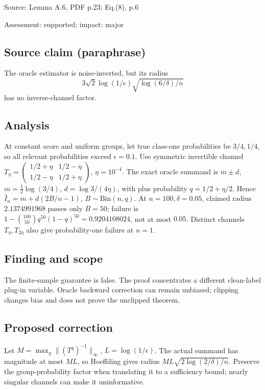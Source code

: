 \documentclass[11pt]{article}
\begin{document}
Source: Lemma A.6, PDF p.23; Eq.(8), p.6

Assessment: supported; impact: major

\subsection*{Source claim (paraphrase)}

The oracle estimator is noise-inverted, but its radius \[3\sqrt2\log(1/\epsilon)\sqrt{\log(6/\delta)/n}\] has no inverse-channel factor.

\subsection*{Analysis}

At constant score and uniform groups, let true class-one probabilities be \(3/4,1/4\), so all relevant probabilities exceed \(\epsilon=0.1\). Use symmetric invertible channel \(T_\eta=\begin{pmatrix}1/2+\eta&1/2-\eta\\1/2-\eta&1/2+\eta\end{pmatrix}\), \(\eta=10^{-4}\). The exact oracle summand is \(m\pm d\), \(m=\tfrac12\log(3/4)\), \(d=\log3/(4\eta)\), with plus probability \(q=1/2+\eta/2\). Hence \(\widehat I_n=m+d(2B/n-1)\), \(B\sim\mathrm{Bin}(n,q)\). At \(n=100,\delta=0.05\), claimed radius \(2.1374991968\) passes only \(B=50\); failure is \(1-\binom{100}{50}q^{50}(1-q)^{50}=0.9204108024\), not at most \(0.05\). Distinct channels \(T_\eta,T_{2\eta}\) also give probability-one failure at \(n=1\).

\subsection*{Finding and scope}

The finite-sample guarantee is false. The proof concentrates a different clean-label plug-in variable. Oracle backward correction can remain unbiased; clipping changes bias and does not prove the unclipped theorem.

\subsection*{Proposed correction}

Let \(M=\max_g\|(T^g)^{-1}\|_\infty\), \(L=\log(1/\epsilon)\). The actual summand has magnitude at most \(ML\), so Hoeffding gives radius \(ML\sqrt{2\log(2/\delta)/n}\). Preserve the group-probability factor when translating it to a sufficiency bound; nearly singular channels can make it uninformative.
\end{document}
